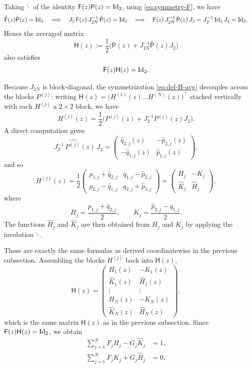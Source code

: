 \documentclass[11pt]{amsart}
\begin{document}
Taking $\hat{\cdot}$ of the identity $\mathsf{F}(z) \mathsf{P}(z)=\textnormal{Id}_2$, using \eqref{eq:symmetry-F}, we have
$$
\hat{\mathsf{F}}(z)\hat{\mathsf{P}}(z) = \textnormal{Id}_2
\quad\Longrightarrow\quad
J_2\,\mathsf{F}(z)\,J_{2N}^{-1}\,\hat{\mathsf{P}}(z) = \textnormal{Id}_2
\quad\Longrightarrow\quad
\mathsf{F}(z)\,J_{2N}^{-1}\,\hat{\mathsf{P}}(z)\,J_2 = J_2^{-1}\,\textnormal{Id}_2\,J_2 = \textnormal{Id}_2.
$$
Hence the averaged matrix
\begin{equation}
\label{eq:def-H-avg}
\mathsf{H}(z):=\frac12\Big(\mathsf{P}(z)+J_{2N}^{-1}\widehat{\mathsf{P}}(z)J_2\Big)
\end{equation}
also satisfies
$$
\mathsf{F}(z) \mathsf{H}(z)=\textnormal{Id}_2.
$$

Because $J_{2N}$ is block-diagonal, the symmetrization \eqref{eq:def-H-avg} decouples across the blocks $P^{(j)}$: writing $\mathsf{H}(z) = \bigl(H^{(1)}(z) \ldots H^{(N)}(z)\bigr)^\top$ stacked vertically with each $H^{(j)}$ a $2 \times 2$ block, we have
$$
H^{(j)}(z) = \frac12\bigl(P^{(j)}(z) + J_2^{-1} \widehat{P^{(j)}}(z) J_2\bigr).
$$
A direct computation gives
$$
J_2^{-1}\,\widehat{P^{(j)}}(z)\,J_2=
\begin{pmatrix}
\hat{q}_{2,j}(z) & -\hat{p}_{2,j}(z)\\
-\hat{q}_{1,j}(z) & \hat{p}_{1,j}(z)
\end{pmatrix},
$$
and so
$$
H^{(j)}(z)=
\frac12
\begin{pmatrix}
p_{1,j}+\hat{q}_{2,j} & q_{1,j}-\hat{p}_{2,j}\\
p_{2,j}-\hat{q}_{1,j} & q_{2,j}+\hat{p}_{1,j}
\end{pmatrix}=
\begin{pmatrix}
H_j & -K_j\\
\hat K_j & \hat{H}_j
\end{pmatrix},
$$
where
$$
H_j=\frac{p_{1,j}+\hat{q}_{2,j}}{2},
\qquad
K_j=\frac{\hat p_{2,j}-q_{1,j}}{2}.
$$
The functions $\hat{H}_j$ and $\hat{K}_j$ are then obtained from $H_j$ and $K_j$ by applying the involution $\hat{\cdot}$.

These are exactly the same formulas as derived coordinatewise in the previous subsection.  Assembling the blocks $H^{(j)}$ back into $\mathsf{H}(z)$,
$$
\mathsf{H}(z)=
\left(
\begin{array}{cc}
H_1(z) & -K_1(z) \\
\hat K_1(z) & \hat H_1(z) \\
\vdots & \vdots \\
H_N(z) & -K_N(z) \\
\hat K_N(z) & \hat H_N(z)
\end{array}
\right),
$$
which is the same matrix $\mathsf{H}(z)$ as in the previous subsection.  Since $\mathsf{F}(z) \mathsf{H}(z)=\textnormal{Id}_2$, we obtain
\begin{align*}
\sum_{j=1}^N F_j H_j-G_j\widehat{K}_j&=1,\\
\sum_{j=1}^N F_j K_j+G_j\widehat{H}_j&=0.
\end{align*}
\end{document}

